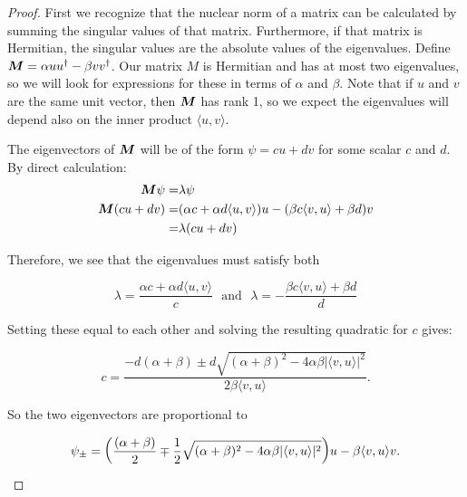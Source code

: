 \begin{proof}  
First we recognize that the nuclear norm of a matrix can be calculated by summing the singular values of that matrix.  
Furthermore, if that matrix is Hermitian, the singular values are the absolute values of the eigenvalues.  
Define $\boldsymbol{M} = \alpha u u^{\dag} - \beta v v^{\dag}$.
Our matrix $M$ is Hermitian and has at most two eigenvalues, so we will look for expressions for these in terms of $\alpha$ and $\beta$.
Note that if $u$ and $v$ are the same unit vector, then $\boldsymbol{M}$ has rank 1, so we expect the eigenvalues will depend also on the inner product $\langle u,v \rangle$.

The eigenvectors of $\boldsymbol{M}$ will be of the form $\psi = c u + d v$ for some scalar $c$ and $d$.
By direct calculation:
\begin{equation}
\begin{split}
\boldsymbol{M}\psi =& \lambda \psi \\
\boldsymbol{M}(cu + dv) =& (\alpha c + \alpha d \langle u,v \rangle) u - (\beta c \langle v,u \rangle + \beta d )v\\
=& \lambda (c u + d v)
\end{split}
\end{equation}

Therefore, we see that the eigenvalues must satisfy both

\begin{equation}\label{eq:lambdas}
\lambda = \frac{\alpha c + \alpha d \langle u,v \rangle}{c} \:\:\: \text{and} \:\:\:  \lambda = -\frac{\beta c \langle v,u \rangle + \beta d}{d}
\end{equation}

Setting these equal to each other and solving the resulting quadratic for $c$ gives:

\begin{equation}\label{eq:cvalue}
c = \frac{-d (\alpha + \beta) \pm d \sqrt{(\alpha + \beta)^2 - 4 \alpha \beta \lvert \langle v,u \rangle \lvert^2 }}{2 \beta \langle v,u \rangle }.
\end{equation}

So the two eigenvectors are proportional to

\begin{equation}
    \psi_{\pm} =  \bigg{(}\frac{(\alpha + \beta)}{2} \mp  \frac{1}{2} \sqrt{(\alpha + \beta)^2 - 4 \alpha \beta \lvert \langle v,u \rangle \lvert^2 }\bigg{)} u -  \beta \langle v,u \rangle v.
\end{equation}


\end{proof}
